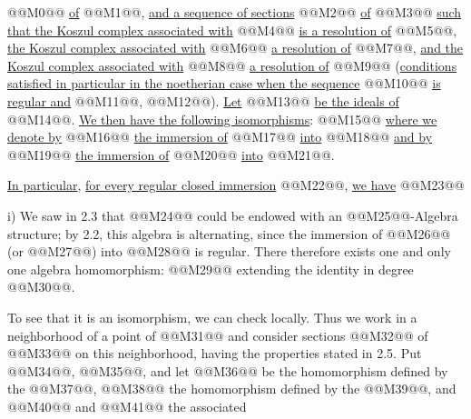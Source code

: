 @@M0@@ \uline{of} @@M1@@, \uline{and a sequence of sections} @@M2@@ \uline{of} @@M3@@ \uline{such that the Koszul complex associated with} @@M4@@ \uline{is a resolution of} @@M5@@, \uline{the Koszul complex associated with} @@M6@@ \uline{a resolution of} @@M7@@, \uline{and the Koszul complex associated with} @@M8@@ \uline{a resolution of} @@M9@@ (\uline{conditions satisfied in particular in the noetherian case when the sequence} @@M10@@ \uline{is regular and} @@M11@@, @@M12@@). \uline{Let} @@M13@@ \uline{be the ideals of} @@M14@@. \uline{We then have the following isomorphisms}:
@@M15@@
\uline{where we denote by} @@M16@@ \uline{the immersion of} @@M17@@ \uline{into} @@M18@@ \uline{and by} @@M19@@ \uline{the immersion of} @@M20@@ \uline{into} @@M21@@.

\uline{In particular}, \uline{for every regular closed immersion} @@M22@@, \uline{we have}
@@M23@@

i) We saw in 2.3 that @@M24@@ could be endowed with an @@M25@@-Algebra structure; by 2.2, this algebra is alternating, since the immersion of @@M26@@ (or @@M27@@) into @@M28@@ is regular. There therefore exists one and only one algebra homomorphism:
@@M29@@
extending the identity in degree @@M30@@.

To see that it is an isomorphism, we can check locally. Thus we work in a neighborhood of a point of @@M31@@ and consider sections @@M32@@ of @@M33@@ on this neighborhood, having the properties stated in 2.5. Put @@M34@@, @@M35@@, and let @@M36@@ be the homomorphism defined by the @@M37@@, @@M38@@ the homomorphism defined by the @@M39@@, and @@M40@@ and @@M41@@ the associated

